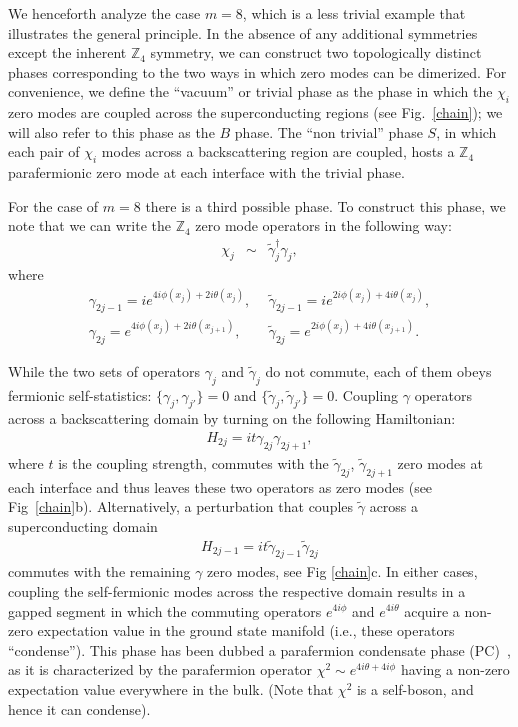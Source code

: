 \documentclass[twocolumn,aps,prb,showpacs]{revtex4-1}
\begin{document}
We henceforth analyze the case $m=8$, which is a less trivial example that illustrates the general principle.
In the absence of any additional symmetries except the inherent $\mathbb{Z}_4$ symmetry, we can construct two topologically distinct phases corresponding to the two ways in which zero modes can be dimerized. For convenience, we define the ``vacuum'' or trivial phase as the phase in which the $\chi_i$ zero modes are coupled across the superconducting regions (see Fig.~\ref{chain}); we will also refer to this phase as the $B$ phase. The ``non trivial'' phase $S$, in which each pair of $\chi_i$ modes across a backscattering region are coupled, hosts a $\mathbb{Z}_4$ parafermionic zero mode at each interface with the trivial phase.

For the case of $m=8$ there is a third possible phase. To construct this phase, we note that we can write the $\mathbb{Z}_4$ zero mode operators in the following way:
\begin{eqnarray}
\nonumber
\chi_j &\sim & \tilde{\gamma}_j^\dag \gamma_j,
\end{eqnarray}
where
\begin{eqnarray}
\nonumber
 \gamma_{2j-1} =i e^{4i\phi(x_{j})+2i\theta(x_{j})},\ \   & \tilde{\gamma}_{2j-1}=i e^{2i\phi(x_{j})+4i\theta(x_{j})},  \\
\nonumber
 \gamma_{2j} =e^{4i\phi(x_{j})+2i\theta(x_{j+1})},\ \   & \tilde{\gamma}_{2j}=e^{2i\phi(x_{j})+4i\theta(x_{j+1})}.
\end{eqnarray}

While the two sets of operators $\gamma_j $ and $\tilde{\gamma}_j $ do not commute, each of them obeys fermionic self-statistics: $\{ \gamma_j, \gamma_{j'}\} =0$ and $\{\tilde{\gamma}_j, \tilde{\gamma}_{j'}\} = 0$.
Coupling  $ \gamma$ operators across a backscattering domain by turning on the following Hamiltonian:
\begin{eqnarray}
H_{2j} = i t \gamma_{2j}\gamma_{2j+1},
\end{eqnarray}
where $t$ is the coupling strength, commutes with the  $\tilde{\gamma}_{2j} $, $\tilde{\gamma}_{2j+1}$ zero modes at each interface and thus
leaves these two operators as zero modes (see Fig~\ref{chain}b). Alternatively, a perturbation that couples $ \tilde{\gamma}$  across a superconducting domain
\begin{eqnarray}
H_{2j-1} = it \tilde{\gamma}_{2j-1}\tilde{\gamma}_{2j}
\end{eqnarray}
commutes with the remaining  $ \gamma$ zero modes, see Fig \ref{chain}c.
In either cases,  coupling the self-fermionic modes across the respective domain results in a gapped segment in which  the commuting operators $e^{4i \phi} $ and $e^{4i \theta} $ acquire a non-zero expectation value in the ground state manifold (i.e., these operators ``condense''). This phase has been dubbed a parafermion condensate phase (PC)~\cite{Motruk2013}, as it is characterized by the parafermion operator $\chi^2 \sim e^{4i\theta + 4i\phi}$ having a non-zero expectation value everywhere in the bulk. (Note that $\chi^2$ is a self-boson, and hence it can condense).
\end{document}
